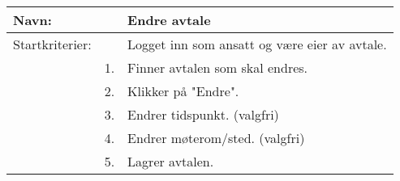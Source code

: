 \begin{enumerate}
{\begin{minipage}[t]{\linewidth}
{	\begin{tabularx}{\linewidth}{| l r X |}
	\hline
	Navn: & & Endre avtale\\ \hline
	Startkriterier: & & Logget inn som ansatt og være eier av avtale.\\ \hline
	& 1. & Finner avtalen som skal endres. \\
	& 2. & Klikker på "Endre". \\ 
	& 3. & Endrer tidspunkt. (valgfri) \\
	& 4. & Endrer møterom/sted. (valgfri) \\ 
	& 5. & Lagrer avtalen. \\   \hline
	\end{tabularx}}
\end{minipage}
}
\end{enumerate}
